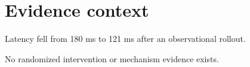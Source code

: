 \section{Evidence context}
Latency fell from 180 ms to 121 ms after an observational rollout.

No randomized intervention or mechanism evidence exists.
